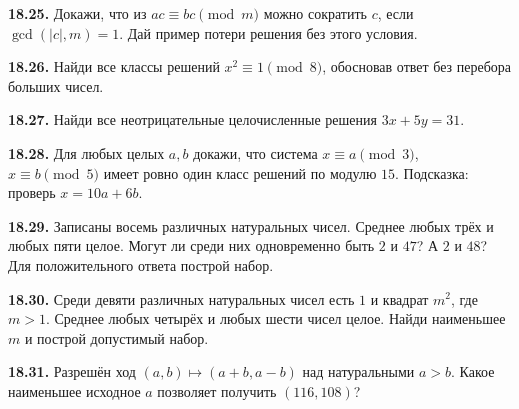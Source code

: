 \noindent\begin{minipage}[t]{\linewidth}\textbf{18.25.} Докажи, что из \(ac\equiv bc\pmod m\) можно сократить \(c\), если \(\gcd(|c|,m)=1\). Дай пример потери решения без этого условия.\par\end{minipage}\par
\noindent\begin{minipage}[t]{\linewidth}\textbf{18.26.}\starmark{} Найди все классы решений \(x^2\equiv1\pmod8\), обосновав ответ без перебора больших чисел.\par\end{minipage}\par
\noindent\begin{minipage}[t]{\linewidth}\textbf{18.27.}\starmark{} Найди все неотрицательные целочисленные решения \(3x+5y=31\).\par\end{minipage}\par
\noindent\begin{minipage}[t]{\linewidth}\textbf{18.28.}\starmark{} Для любых целых \(a,b\) докажи, что система \(x\equiv a\pmod3\), \(x\equiv b\pmod5\) имеет ровно один класс решений по модулю \(15\). Подсказка: проверь \(x=10a+6b\).\par\end{minipage}\par
\noindent\begin{minipage}[t]{\linewidth}\textbf{18.29.}\starmark{} Записаны восемь различных натуральных чисел. Среднее любых трёх и любых пяти целое. Могут ли среди них одновременно быть \(2\) и \(47\)? А \(2\) и \(48\)? Для положительного ответа построй набор.\par\end{minipage}\par
\noindent\begin{minipage}[t]{\linewidth}\textbf{18.30.}\starmark{} Среди девяти различных натуральных чисел есть \(1\) и квадрат \(m^2\), где \(m>1\). Среднее любых четырёх и любых шести чисел целое. Найди наименьшее \(m\) и построй допустимый набор.\par\end{minipage}\par
\noindent\begin{minipage}[t]{\linewidth}\textbf{18.31.}\starmark{} Разрешён ход \((a,b)\mapsto(a+b,a-b)\) над натуральными \(a>b\). Какое наименьшее исходное \(a\) позволяет получить \((116,108)\)?\par\end{minipage}\par
